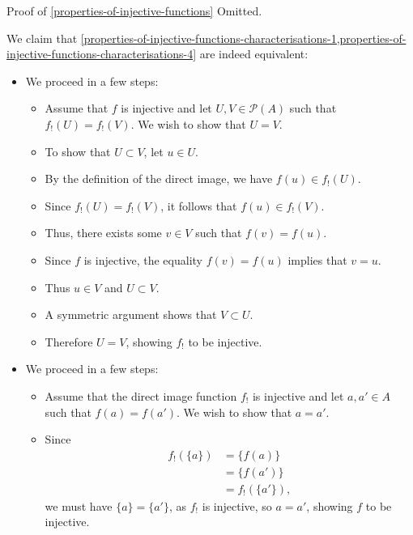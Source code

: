 \begin{Proof}{Proof of \cref{properties-of-injective-functions}}
    Omitted.

    We claim that \cref{properties-of-injective-functions-characterisations-1,properties-of-injective-functions-characterisations-4} are indeed equivalent:
    \begin{itemize}
        \item{}We proceed in a few steps:
            \begin{itemize}
                \item Assume that $f$ is injective and let $U,V\in\mathcal{P}(A)$ such that $f_{!}(U)=f_{!}(V)$. We wish to show that $U=V$.
                \item To show that $U\subset V$, let $u\in U$.
                \item By the definition of the direct image, we have $f(u)\in f_{!}(U)$.
                \item Since $f_{!}(U)=f_{!}(V)$, it follows that $f(u)\in f_{!}(V)$.
                \item Thus, there exists some $v\in V$ such that $f(v)=f(u)$.
                \item Since $f$ is injective, the equality $f(v)=f(u)$ implies that $v=u$.
                \item Thus $u\in V$ and $U\subset V$.
                \item A symmetric argument shows that $V\subset U$.
                \item Therefore $U=V$, showing $f_{!}$ to be injective.
            \end{itemize}
        \item{}We proceed in a few steps:
            \begin{itemize}
                \item Assume that the direct image function $f_{!}$ is injective and let $a,a'\in A$ such that $f(a)=f(a')$. We wish to show that $a=a'$.
                \item Since
                    \begin{align*}
                        f_{!}(\{a\}) &= \{f(a)\}\\
                                     &= \{f(a')\}\\
                                     &= f_{!}(\{a'\}),
                    \end{align*}
                    we must have $\{a\}=\{a'\}$, as $f_{!}$ is injective, so $a=a'$, showing $f$ to be injective.
            \end{itemize}
    \end{itemize}


\end{Proof}
